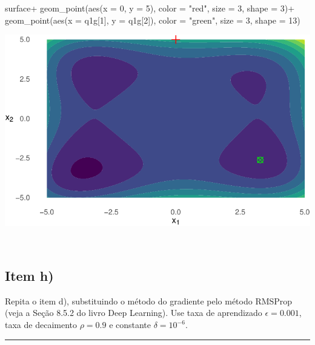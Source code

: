 \documentclass[
  a4paperpaper,
]{article}
\newenvironment{Shaded}{\begin{snugshade}}{\end{snugshade}}
\newcommand{\AttributeTok}[1]{\textcolor[rgb]{0.40,0.45,0.13}{#1}}
\newcommand{\DecValTok}[1]{\textcolor[rgb]{0.68,0.00,0.00}{#1}}
\newcommand{\FunctionTok}[1]{\textcolor[rgb]{0.28,0.35,0.67}{#1}}
\newcommand{\NormalTok}[1]{\textcolor[rgb]{0.00,0.23,0.31}{#1}}
\newcommand{\SpecialCharTok}[1]{\textcolor[rgb]{0.37,0.37,0.37}{#1}}
\newcommand{\StringTok}[1]{\textcolor[rgb]{0.13,0.47,0.30}{#1}}
\begin{document}
\begin{Shaded}
\begin{Highlighting}[]
\NormalTok{surface}\SpecialCharTok{+}
  \FunctionTok{geom\_point}\NormalTok{(}\FunctionTok{aes}\NormalTok{(}\AttributeTok{x =} \DecValTok{0}\NormalTok{, }\AttributeTok{y =} \DecValTok{5}\NormalTok{), }\AttributeTok{color =} \StringTok{"red"}\NormalTok{, }\AttributeTok{size =} \DecValTok{3}\NormalTok{, }\AttributeTok{shape =} \DecValTok{3}\NormalTok{)}\SpecialCharTok{+}
  \FunctionTok{geom\_point}\NormalTok{(}\FunctionTok{aes}\NormalTok{(}\AttributeTok{x =}\NormalTok{ q1g[}\DecValTok{1}\NormalTok{], }\AttributeTok{y =}\NormalTok{ q1g[}\DecValTok{2}\NormalTok{]), }\AttributeTok{color =} \StringTok{"green"}\NormalTok{, }\AttributeTok{size =} \DecValTok{3}\NormalTok{, }\AttributeTok{shape =} \DecValTok{13}\NormalTok{)}
\end{Highlighting}
\end{Shaded}

\includegraphics{lista3-resolucao_files/figure-pdf/q1g-1.pdf}

~

\subsection{Item h)}\label{item-h}

Repita o item d), substituindo o método do gradiente pelo método RMSProp
(veja a Seção 8.5.2 do livro Deep Learning). Use taxa de aprendizado
\(\epsilon = 0.001\), taxa de decaimento \(\rho = 0.9\) e constante
\(\delta = 10^{−6}\).

\begin{center}\rule{0.5\linewidth}{0.5pt}\end{center}

~
\end{document}
